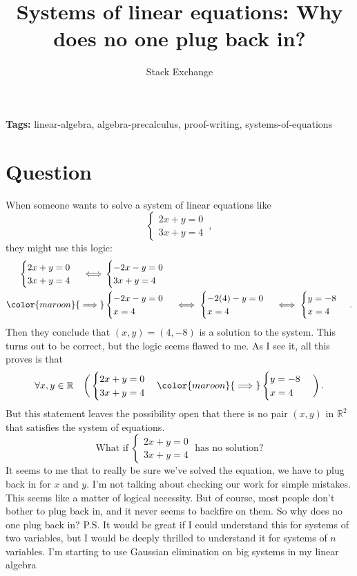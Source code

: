 \documentclass{article}
\title{Systems of linear equations: Why does no one plug back in?}
\author{Stack Exchange}
\date{}
\begin{document}
\maketitle

\noindent\textbf{Tags:} linear-algebra, algebra-precalculus, proof-writing, systems-of-equations

\section*{Question}
When someone wants to solve a system of linear equations like $$\begin{cases} 2x+y=0 \\ 3x+y=4 \end{cases}\,,$$ they might use this logic: $$\begin{align} \begin{cases} 2x+y=0 \\ 3x+y=4 \end{cases} \iff &\begin{cases} -2x-y=0 \\ 3x+y=4 \end{cases} \\ \color{maroon}{\implies} &\begin{cases} -2x-y=0\\ x=4 \end{cases} \iff \begin{cases} -2(4)-y=0\\ x=4 \end{cases} \iff \begin{cases} y=-8\\ x=4 \end{cases} \,.\end{align}$$ Then they conclude that $(x, y) = (4, -8)$ is a solution to the system. This turns out to be correct, but the logic seems flawed to me. As I see it, all this proves is that $$ \forall{x,y\in\mathbb{R}}\quad \bigg( \begin{cases} 2x+y=0 \\ 3x+y=4 \end{cases} \color{maroon}{\implies} \begin{cases} y=-8\\ x=4 \end{cases} \bigg)\,. $$ But this statement leaves the possibility open that there is no pair $(x, y)$ in $\mathbb{R}^2$ that satisfies the system of equations. $$ \text{What if}\; \begin{cases} 2x+y=0 \\ 3x+y=4 \end{cases} \;\text{has no solution?} $$ It seems to me that to really be sure we've solved the equation, we have to plug back in for $x$ and $y$. I'm not talking about checking our work for simple mistakes. This seems like a matter of logical necessity. But of course, most people don't bother to plug back in, and it never seems to backfire on them. So why does no one plug back in? P.S. It would be great if I could understand this for systems of two variables, but I would be deeply thrilled to understand it for systems of $n$ variables. I'm starting to use Gaussian elimination on big systems in my linear algebra 
\end{document}

